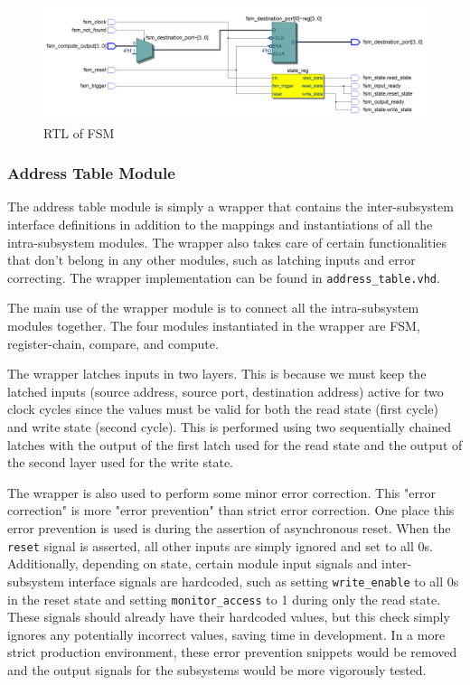 \documentclass{article}
\begin{document}
\begin{figure}[ht!]
  \centering
  	\includegraphics[width=1.0\textwidth]{fsm_rtl.PNG}
  \caption{RTL of FSM}
  \label{fig:fsm-rtl}
\end{figure}

\subsubsection{Address Table Module}

The address table module is simply a wrapper that contains the inter-subsystem interface definitions in addition to the mappings and instantiations of all the intra-subsystem modules. The wrapper also takes care of certain functionalities that don't belong in any other modules, such as latching inputs and error correcting. The wrapper implementation can be found in \texttt{address\_table.vhd}.

The main use of the wrapper module is to connect all the intra-subsystem modules together. The four modules instantiated in the wrapper are FSM, register-chain, compare, and compute. 

The wrapper latches inputs in two layers. This is because we must keep the latched inputs (source address, source port, destination address) active for two clock cycles since the values must be valid for both the read state (first cycle) and write state (second cycle). This is performed using two sequentially chained latches with the output of the first latch used for the read state and the output of the second layer used for the write state.

The wrapper is also used to perform some minor error correction. This "error correction" is more "error prevention" than strict error correction. One place this error prevention is used is during the assertion of asynchronous reset. When the \texttt{reset} signal is asserted, all other inputs are simply ignored and set to all 0s. Additionally, depending on state, certain module input signals and inter-subsystem interface signals are hardcoded, such as setting \texttt{write\_enable} to all 0s in the reset state and setting \texttt{monitor\_access} to 1 during only the read state. These signals should already have their hardcoded values, but this check simply ignores any potentially incorrect values, saving time in development. In a more strict production environment, these error prevention snippets would be removed and the output signals for the subsystems would be more vigorously tested.
\end{document}

